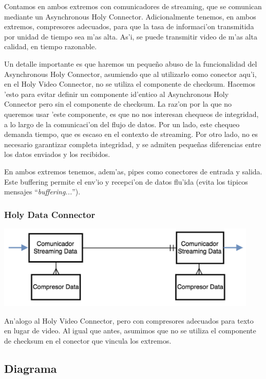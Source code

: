 Contamos en ambos extremos con comunicadores de streaming, que se comunican mediante un Asynchronous Holy Connector. Adicionalmente tenemos, en ambos extremos, compresores adecuados, para que la tasa de informaci'on transmitida por unidad de tiempo sea m'as alta. As'i, se puede transmitir video de m'as alta calidad, en tiempo razonable.

Un detalle importante es que haremos un peque\~no abuso de la funcionalidad del Asynchronous Holy Connector, asumiendo que al utilizarlo como conector aqu'i, en el Holy Video Connector, no se utiliza el componente de checksum. Hacemos 'esto para evitar definir un componente id'entico al Asynchronous Holy Connector pero sin el componente de checksum. La raz'on por la que no queremos usar 'este componente, es que no nos interesan chequeos de integridad, a lo largo de la comunicaci'on del flujo de datos. Por un lado, este chequeo demanda tiempo, que es escaso en el contexto de streaming. Por otro lado, no es necesario garantizar completa integridad, y se admiten peque\~nas diferencias entre los datos enviados y los recibidos.

En ambos extremos tenemos, adem'as, pipes como conectores de entrada y salida. Este buffering permite el env'io y recepci'on de datos flu'ida (evita los tipicos mensajes ``\textit{buffering...}'').


\subsubsection{Holy Data Connector}

\includegraphics[height=4cm]{diagramas/HDC} 

An'alogo al Holy Video Connector, pero con compresores adecuados para texto en lugar de video. Al igual que antes, asumimos que no se utiliza el componente de checksum en el conector que vincula los extremos.

\subsection{Diagrama}

